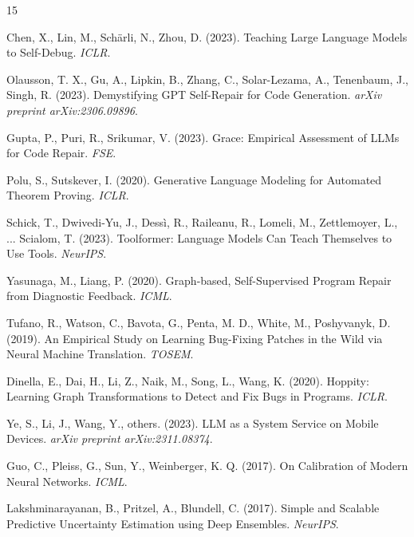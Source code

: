 \documentclass[11pt,a4paper]{article}
\begin{document}

\begin{thebibliography}{15}

 Chen, X., Lin, M., Sch\"{a}rli, N.,  Zhou, D. (2023). Teaching Large Language Models to Self-Debug. \textit{ICLR}.

 Olausson, T. X., Gu, A., Lipkin, B., Zhang, C., Solar-Lezama, A., Tenenbaum, J.,  Singh, R. (2023). Demystifying GPT Self-Repair for Code Generation. \textit{arXiv preprint arXiv:2306.09896}.

 Gupta, P., Puri, R.,  Srikumar, V. (2023). Grace: Empirical Assessment of LLMs for Code Repair. \textit{FSE}.

 Polu, S.,  Sutskever, I. (2020). Generative Language Modeling for Automated Theorem Proving. \textit{ICLR}.

 Schick, T., Dwivedi-Yu, J., Dess\`{i}, R., Raileanu, R., Lomeli, M., Zettlemoyer, L., ...  Scialom, T. (2023). Toolformer: Language Models Can Teach Themselves to Use Tools. \textit{NeurIPS}.

 Yasunaga, M.,  Liang, P. (2020). Graph-based, Self-Supervised Program Repair from Diagnostic Feedback. \textit{ICML}.

 Tufano, R., Watson, C., Bavota, G., Penta, M. D., White, M.,  Poshyvanyk, D. (2019). An Empirical Study on Learning Bug-Fixing Patches in the Wild via Neural Machine Translation. \textit{TOSEM}.

 Dinella, E., Dai, H., Li, Z., Naik, M., Song, L.,  Wang, K. (2020). Hoppity: Learning Graph Transformations to Detect and Fix Bugs in Programs. \textit{ICLR}.

 Ye, S., Li, J., Wang, Y.,  others. (2023). LLM as a System Service on Mobile Devices. \textit{arXiv preprint arXiv:2311.08374}.

 Guo, C., Pleiss, G., Sun, Y.,  Weinberger, K. Q. (2017). On Calibration of Modern Neural Networks. \textit{ICML}.

 Lakshminarayanan, B., Pritzel, A.,  Blundell, C. (2017). Simple and Scalable Predictive Uncertainty Estimation using Deep Ensembles. \textit{NeurIPS}.


\end{thebibliography}
\end{document}
